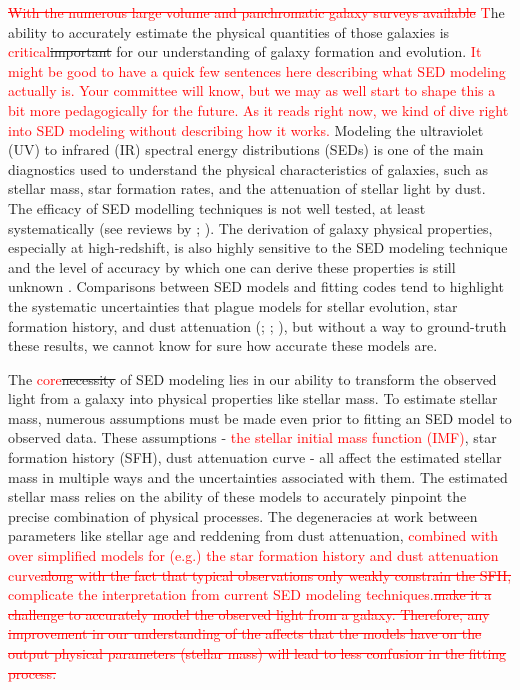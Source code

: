 \documentclass[twocolumn]{aastex62}
\newcommand{\red}[1]{{\textcolor{red}{#1}}}
\begin{document}
\red{\sout{With the numerous large volume and panchromatic galaxy surveys available}} \red{T}he ability to accurately estimate the physical quantities of those galaxies is \red{critical}\sout{important} for our understanding of galaxy formation and evolution. \red{It might be good to have a quick few sentences here describing what SED modeling actually is.  Your committee will know, but we may as well start to shape this a bit more pedagogically for the future.  As it reads right now, we kind of dive right into SED modeling without describing how it works.}  Modeling the ultraviolet (UV) to infrared (IR) spectral energy distributions (SEDs) is one of the main diagnostics used to understand the physical characteristics of galaxies, such as stellar mass, star formation rates, and the attenuation of stellar light by dust. The efficacy of SED modelling techniques is not well tested, at least systematically (see reviews by \cite{conroy_modeling_2013}; \cite{walcher_fitting_2011}). The derivation of galaxy physical properties, especially at high-redshift, is also highly sensitive to the SED modeling technique and the level of accuracy by which one can derive these properties is still unknown \citep{hayward_should_2015}. Comparisons between SED models and fitting codes tend to highlight the systematic uncertainties that plague models for stellar evolution, star formation history, and dust attenuation (\cite{hunt_comprehensive_2019}; \cite{mitchell_how_2013}; \cite{pforr_recovering_2012}), but without a way to ground-truth these results, we cannot know for sure how accurate these models are. 


The \red{core}\sout{necessity} of SED modeling lies in our ability to transform the observed light from a galaxy into physical properties like stellar mass. To estimate stellar mass, numerous assumptions must be made even prior to fitting an SED model to observed data. These assumptions - \red{the stellar initial mass function (IMF)}, star formation history (SFH), dust attenuation curve - all affect the estimated stellar mass in multiple ways and the uncertainties associated with them. The estimated stellar mass relies on the ability of these models to accurately pinpoint the precise combination of physical processes. The degeneracies at work between parameters like stellar age and reddening from dust attenuation, \red{combined with over simplified models for (e.g.) the star formation history and dust attenuation curve\sout{along with the fact that typical observations only weakly constrain the SFH,}} \red{complicate the interpretation from current SED modeling techniques.}\red{\sout{make it a challenge to accurately model the observed light from a galaxy. Therefore, any improvement in our understanding of the affects that the models have on the output physical parameters (stellar mass) will lead to less confusion in the fitting process. }}
\end{document}
